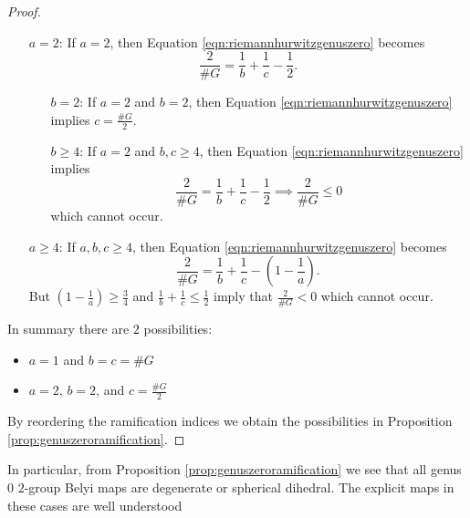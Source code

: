\documentclass{dcthesis}
\numberwithin{equation}{section}
\theoremstyle{definition}
\theoremstyle{remark}
\begin{document}
{{\begin{proof}
\begin{itemize}
\begin{itemize}
\[                \implies
                \#G\left(2^{n-m}+1\right) = 2^{n+1}.
              \]
              Since $\#G$ is a power of $2$, we must have
              $2^{n-m}+1\in\{1,2\}$ which only occurs when $m=n$.
              Therefore $m=n$ which implies $b=c=\#G$.
          \end{itemize}
        \item[\underline{$a=2$}:]
          If $a=2$, then
          Equation \ref{eqn:riemannhurwitzgenuszero} becomes
          \[
            \frac{2}{\#G} = \frac{1}{b}+\frac{1}{c}-\frac{1}{2}.
          \]
          \begin{itemize}
            \item[\underline{$b=2$}:]
              If $a=2$ and $b=2$, then
              Equation \ref{eqn:riemannhurwitzgenuszero} implies
              $c=\frac{\#G}{2}$.
            \item[\underline{$b\ge 4$}:]
              If $a=2$ and $b,c\geq 4$, then
              Equation \ref{eqn:riemannhurwitzgenuszero} implies
              \[
                \frac{2}{\#G} = \frac{1}{b}+\frac{1}{c}-\frac{1}{2}
                \implies
                \frac{2}{\#G}\le 0
              \]
              which cannot occur.
          \end{itemize}
        \item[\underline{$a\geq 4$}:]
          If $a,b,c\geq 4$, then
          Equation \ref{eqn:riemannhurwitzgenuszero} becomes
          \[
            \frac{2}{\#G} = \frac{1}{b}+\frac{1}{c} - \left(1-\frac{1}{a}\right).
          \]
          But
          $\left(1-\frac{1}{a}\right)\ge\frac{3}{4}$
          and
          $\frac{1}{b}+\frac{1}{c}\le\frac{1}{2}$
          imply that
          $\frac{2}{\#G}<0$
          which cannot occur.
      \end{itemize}
      In summary there are $2$ possibilities:
      \begin{itemize}
        \item $a=1$ and $b=c=\#G$
        \item $a=2$, $b=2$, and $c=\frac{\#G}{2}$
      \end{itemize}
      By reordering the ramification indices
      we obtain the possibilities in Proposition \ref{prop:genuszeroramification}.
    \end{proof}
    In particular,
    from
    Proposition \ref{prop:genuszeroramification}
    we see that all genus $0$ $2$-group Belyi maps
    are degenerate or spherical dihedral.
    The explicit maps in these cases are well understood
}}
\end{document}
